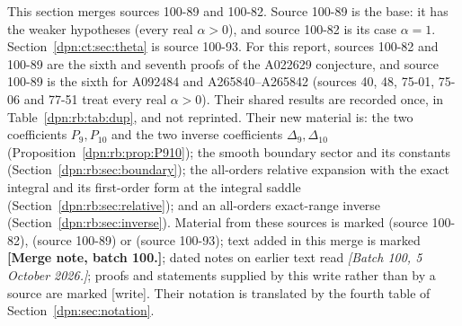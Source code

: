 \documentclass[11pt]{article}
\numberwithin{equation}{section}
\theoremstyle{definition}\newtheorem{definition}[theorem]{Definition}
\theoremstyle{remark}\newtheorem{remark}[theorem]{Remark}
\newcommand{\src}[1]{\textup{(source #1)}}
\newcommand{\wrt}{\textup{[write]}}
\begin{document}
This section merges sources 100-89 and 100-82.  Source 100-89 is the base:
it has the weaker hypotheses (every real $\alpha>0$), and source 100-82 is its
case $\alpha=1$.  Section~\ref{dpn:ct:sec:theta} is source 100-93.  For this
report, sources 100-82 and 100-89 are the sixth and seventh proofs of the
A022629 conjecture, and source 100-89 is the sixth for A092484 and
A265840--A265842 (sources 40, 48, 75-01, 75-06 and 77-51 treat every real
$\alpha>0$).  Their shared results are recorded once, in
Table~\ref{dpn:rb:tab:dup}, and not reprinted.  Their new material is: the two
coefficients $P_9,P_{10}$ and the two inverse coefficients $\Delta_9,\Delta_{10}$
(Proposition~\ref{dpn:rb:prop:P910}); the smooth boundary sector and its
constants (Section~\ref{dpn:rb:sec:boundary}); the all-orders relative
expansion with the exact integral and its first-order form at the integral
saddle (Section~\ref{dpn:rb:sec:relative}); and an all-orders exact-range
inverse (Section~\ref{dpn:rb:sec:inverse}).  Material from these sources is
marked \src{100-82}, \src{100-89} or \src{100-93}; text added in this merge
is marked \textbf{[Merge note, batch 100.]}; dated notes on earlier text read
\textit{[Batch 100, 5 October 2026.]}; proofs and statements supplied by this
write rather than by a source are marked \wrt.  Their notation is translated
by the fourth table of Section~\ref{dpn:sec:notation}.
\end{document}
